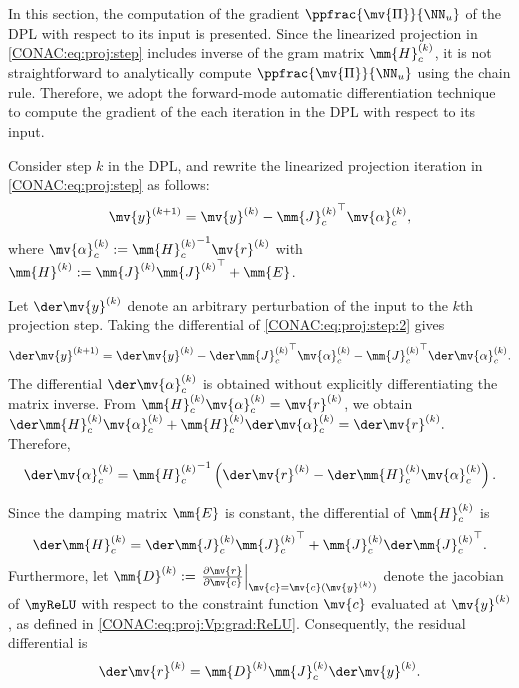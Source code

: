 In this section, the computation of the gradient $\ppfrac{\mv{\Pi}}{\NN_u}$ of the DPL with respect to its input is presented.
Since the linearized projection in \eqref{CONAC:eq:proj:step} includes inverse of the gram matrix $\mm{H}_c^{(k)}$, it is not straightforward to analytically compute $\ppfrac{\mv{\Pi}}{\NN_u}$ using the chain rule.
Therefore, we adopt the forward-mode automatic differentiation technique \cite[Chap. 8.2]{Nocedal:2006aa} to compute the gradient of the each iteration in the DPL with respect to its input.

Consider step $k$ in the DPL, and rewrite the linearized projection iteration in \eqref{CONAC:eq:proj:step} as follows:
\begin{equation}
  \label{CONAC:eq:proj:step:2}
  \mv{y}^{(k+1)}
  =
  \mv{y}^{(k)}
  -
  {\mm{J}_c^{(k)}}^{\top}
  \mv{\alpha}_c^{(k)}
  ,
\end{equation}
where $\mv{\alpha}_c^{(k)}:={\mm{H}_c^{(k)}}^{-1}\mv{r}^{(k)}$ with $\mm{H}^{(k)}:=\mm{J}^{(k)}{\mm{J}^{(k)}}^{\top}+\mm{E}$.


Let $\der\mv{y}^{(k)}$ denote an arbitrary perturbation of the input to the $k$th projection step. Taking the differential of \eqref{CONAC:eq:proj:step:2} gives
\begin{equation}
  \label{CONAC:eq:proj:dy}
  \der\mv{y}^{(k+1)}
  =
  \der\mv{y}^{(k)}
  -
  {\der\mm{J}_c^{(k)}}^{\top}
  \mv{\alpha}_c^{(k)}
  -
  {\mm{J}_c^{(k)}}^{\top}
  \der\mv{\alpha}_c^{(k)}.
\end{equation}
The differential $\der\mv{\alpha}_c^{(k)}$ is obtained without explicitly differentiating the matrix inverse. 
From $\mm{H}_c^{(k)}\mv{\alpha}_c^{(k)} = \mv{r}^{(k)}$, we obtain
$
  \der\mm{H}_c^{(k)}\mv{\alpha}_c^{(k)}
  +
  \mm{H}_c^{(k)}\der\mv{\alpha}_c^{(k)}
  =
  \der\mv{r}^{(k)}
  .
$
Therefore,
\begin{equation}
  \label{CONAC:eq:proj:dalpha}
  \der\mv{\alpha}_c^{(k)}
  =
  {\mm{H}_c^{(k)}}^{-1}
  \left(
    \der\mv{r}^{(k)}
    -
    \der\mm{H}_c^{(k)}\mv{\alpha}_c^{(k)}
  \right).
\end{equation}

Since the damping matrix $\mm{E}$ is constant, the differential of
$\mm{H}_c^{(k)}$ is
\begin{equation}
  \label{CONAC:eq:proj:dH}
  \der\mm{H}_c^{(k)}
  =
  \der\mm{J}_c^{(k)}{\mm{J}_c^{(k)}}^{\top}
  +
  \mm{J}_c^{(k)}
  {\der\mm{J}_c^{(k)}}^{\top}.
\end{equation}
Furthermore, let
$
  \mm{D}^{(k)}
  :=
  \left.
  \frac{\partial\mv{r}}{\partial\mv{c}}
  \right|_{\mv{c}=\mv{c}(\mv{y}^{(k)})}
$
denote the jacobian of $\myReLU$ with respect to the constraint function $\mv{c}$ evaluated at $\mv{y}^{(k)}$, as defined in \eqref{CONAC:eq:proj:Vp:grad:ReLU}. 
Consequently, the residual differential is
\begin{equation}
  \label{CONAC:eq:proj:dr}
  \der\mv{r}^{(k)}
  =
  \mm{D}^{(k)}
  \mm{J}_c^{(k)}
  \der\mv{y}^{(k)}.
\end{equation}

